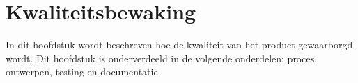 \chapter{Kwaliteitsbewaking}
In dit hoofdstuk wordt beschreven hoe de kwaliteit van het product gewaarborgd wordt.
Dit hoofdstuk is onderverdeeld in de volgende onderdelen: proces, ontwerpen, testing en documentatie.




